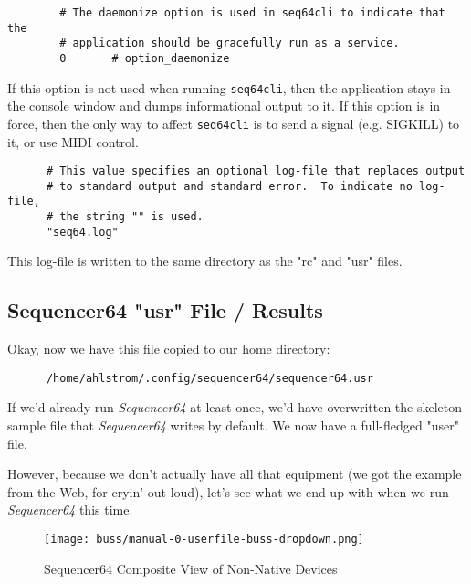    \begin{verbatim}
		# The daemonize option is used in seq64cli to indicate that the
		# application should be gracefully run as a service.
		0       # option_daemonize
   \end{verbatim}

   If this option is not used when running \texttt{seq64cli}, then the
   application stays in the console window and dumps informational output to
   it.  If this option is in force, then the only way to affect
   \texttt{seq64cli} is to send a signal (e.g. SIGKILL) to it, or use
   MIDI control.

   \begin{verbatim}
      # This value specifies an optional log-file that replaces output
      # to standard output and standard error.  To indicate no log-file,
      # the string "" is used.
      "seq64.log"
   \end{verbatim}

   This log-file is written to the same directory as the "rc" and "usr" files.

\subsection{Sequencer64 "usr" File / Results}
\label{subsec:seq64_usr_file_midi_bus_results}

   Okay, now we have this file copied to our home directory:

   \begin{verbatim}
      /home/ahlstrom/.config/sequencer64/sequencer64.usr
   \end{verbatim}

   If we'd already run \textsl{Sequencer64} at least once, we'd have
   overwritten the skeleton sample file that \textsl{Sequencer64}
   writes by default.  We now have a full-fledged "user" file.

   However, because we don't actually have all that equipment (we got the
   example from the Web, for cryin' out loud), let's see what we end up with
   when we run \textsl{Sequencer64} this time.

\begin{figure}[H]
   \centering 
   \texttt{[image: buss/manual-0-userfile-buss-dropdown.png]}
   \caption{Sequencer64 Composite View of Non-Native Devices}
   \label{fig:seq64_manual_0_userfile_buss_dropdown}
\end{figure}

